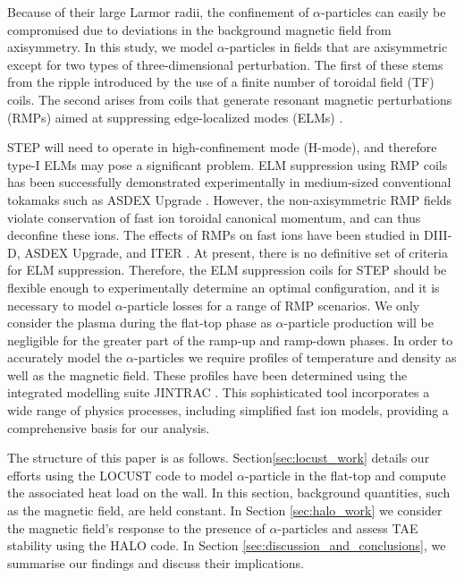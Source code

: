 \documentclass[10pt, a4paper, twoside]{article}
\begin{document}
Because of their large Larmor radii, the confinement of $\alpha$-particles can easily be compromised due to deviations in the background magnetic field from axisymmetry.  In this study, we model $\alpha$-particles in fields that are axisymmetric except for two types of three-dimensional perturbation. The first of these stems from the ripple introduced by the use of a finite number of toroidal field (TF) coils. The second arises from coils that generate resonant magnetic perturbations (RMPs) aimed at suppressing edge-localized modes (ELMs) \cite{zohm1996}.

STEP will need to operate in high-confinement mode (H-mode), and therefore type-I ELMs may pose a significant problem. ELM suppression using RMP coils has been successfully demonstrated experimentally in medium-sized conventional tokamaks such as ASDEX Upgrade \cite{suttrop2018}. However, the non-axisymmetric RMP fields violate conservation of fast ion toroidal canonical momentum, and can thus deconfine these ions. The effects of RMPs on fast ions have been studied in DIII-D, ASDEX Upgrade, and ITER \cite{van2015,sanchis2018,ward2022}. At present, there is no definitive set of criteria for ELM suppression. Therefore, the ELM suppression coils for STEP should be flexible enough to experimentally determine an optimal configuration, and it is necessary to model $\alpha$-particle losses for a range of RMP scenarios.
We only consider the plasma during the flat-top phase as $\alpha$-particle production will be negligible for the greater part of the ramp-up and ramp-down phases. In order to accurately model the $\alpha$-particles we require profiles of temperature and density as well as the magnetic field. These profiles have been determined using the integrated modelling suite JINTRAC \cite{meyer2023, mitchell2023}. This sophisticated tool incorporates a wide range of physics processes, including simplified fast ion models, providing a comprehensive basis for our analysis.

The structure of this paper is as follows. Section\ref{sec:locust_work} details our efforts using the LOCUST code to model $\alpha$-particle in the flat-top and compute the associated heat load on the wall. In this section, background quantities, such as the magnetic field, are held constant. In Section \ref{sec:halo_work} we consider the magnetic field's response to the presence of $\alpha$-particles and assess TAE stability using the HALO code. In Section \ref{sec:discussion_and_conclusions}, we summarise our findings and discuss their implications.
\end{document}
